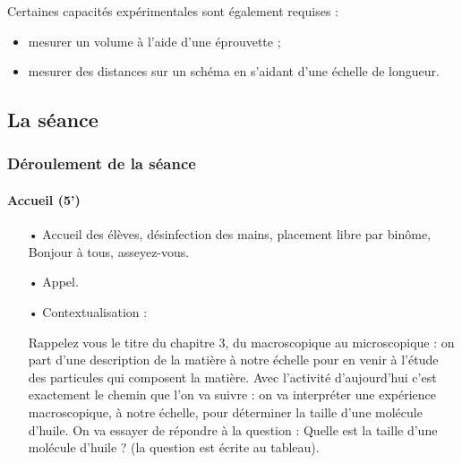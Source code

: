 \documentclass[12pt,a4paper, fleqn]{report}
\begin{document}
Certaines capacités expérimentales sont également requises :
\begin{itemize}
\item mesurer un volume à l'aide d'une éprouvette ;
\item mesurer des distances sur un schéma en s'aidant d'une échelle de longueur.
\end{itemize}

\subsection{La séance}

\subsubsection{Déroulement de la séance}

\paragraph{Accueil (5')}
\begin{itemize}
\item[•] Accueil des élèves, désinfection des mains, placement libre par binôme, \og Bonjour à tous, asseyez-vous. \fg{}
\item[•] Appel.
\item[•] Contextualisation : 

\og Rappelez vous le titre du chapitre 3, du macroscopique au microscopique : on part d'une description de la matière à notre échelle pour en venir à l'étude des particules qui composent la matière.
Avec l'activité d'aujourd'hui c'est exactement le chemin que l'on va suivre : on va interpréter une expérience macroscopique, à notre échelle, pour déterminer la taille d'une molécule d'huile.
On va essayer de répondre à la question : Quelle est la taille d'une molécule d'huile ?\fg{}
(la question est écrite au tableau).
\end{itemize}
\end{document}
